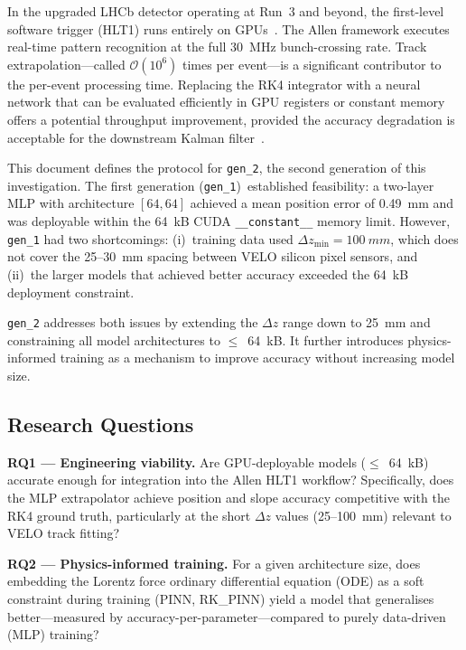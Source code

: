 \documentclass[a4paper,11pt]{article}
\newcommand{\SI}[2]{#1~#2}
\newcommand{\SIrange}[3]{#1--#2~#3}
\newcommand{\kilo}{k}
\newcommand{\byte}{B}
\newcommand{\mega}{M}
\newcommand{\hertz}{Hz}
\newcommand{\mm}{mm}
\newcommand{\dz}{\Delta z}
\begin{document}
In the upgraded LHCb detector operating at Run~3 and beyond, the
first-level software trigger (HLT1) runs entirely on
GPUs~\cite{Allen_GPU}.  The Allen framework executes real-time pattern
recognition at the full \SI{30}{\mega\hertz} bunch-crossing rate.  Track
extrapolation---called $\mathcal{O}(10^6)$ times per event---is a
significant contributor to the per-event processing time.  Replacing the
RK4 integrator with a neural network that can be evaluated efficiently in
GPU registers or constant memory offers a potential throughput improvement,
provided the accuracy degradation is acceptable for the downstream Kalman
filter~\cite{Kalman_filter}.

This document defines the protocol for \texttt{gen\_2}, the second
generation of this investigation.  The first generation
(\texttt{gen\_1})~established feasibility: a two-layer MLP with
architecture $[64, 64]$ achieved a mean position error of \SI{0.49}{\mm}
and was deployable within the \SI{64}{\kilo\byte} CUDA \texttt{\_\_constant\_\_}
memory limit.  However, \texttt{gen\_1} had two shortcomings: (i)~training
data used $\dz_\text{min} = \SI{100}{\mm}$, which does not cover the
\SIrange{25}{30}{\mm} spacing between VELO silicon pixel sensors, and
(ii)~the larger models that achieved better accuracy exceeded the
\SI{64}{\kilo\byte} deployment constraint.

\texttt{gen\_2} addresses both issues by extending the $\dz$ range down
to \SI{25}{\mm} and constraining all model architectures to
$\leq$~\SI{64}{\kilo\byte}.  It further introduces physics-informed
training as a mechanism to improve accuracy without increasing model size.

\subsection{Research Questions}

\noindent\textbf{RQ1 --- Engineering viability.}
Are GPU-deployable models ($\leq$~\SI{64}{\kilo\byte}) accurate enough for
integration into the Allen HLT1 workflow?  Specifically, does the MLP
extrapolator achieve position and slope accuracy competitive with the RK4
ground truth, particularly at the short $\dz$ values
(\SIrange{25}{100}{\mm}) relevant to VELO track fitting?

\noindent\textbf{RQ2 --- Physics-informed training.}
For a given architecture size, does embedding the Lorentz force ordinary
differential equation (ODE) as a soft constraint during training (PINN,
RK\_PINN) yield a model that generalises better---measured by
accuracy-per-parameter---compared to purely data-driven (MLP) training?
\end{document}

